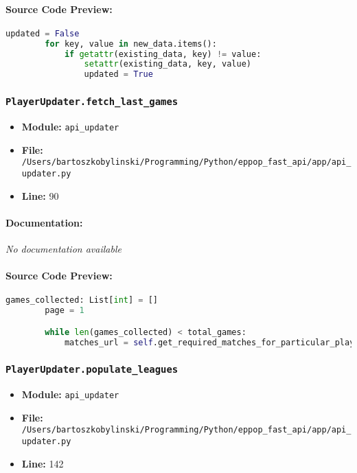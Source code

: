 \documentclass[11pt,a4paper]{article}
\begin{document}
\paragraph{Source Code Preview:}
\begin{lstlisting}[language=Python]
        updated = False
        for key, value in new_data.items():
            if getattr(existing_data, key) != value:
                setattr(existing_data, key, value)
                updated = True
\end{lstlisting}

\vspace{1em}
\subsubsection{\texttt{PlayerUpdater.fetch\_last\_games}}

\begin{itemize}
    \item \textbf{Module:} \texttt{api\_updater}
    \item \textbf{File:} \texttt{/Users/bartoszkobylinski/Programming/Python/eppop\_fast\_api/app/api\_updater.py}
    \item \textbf{Line:} 90
\end{itemize}

\paragraph{Documentation:} \textit{No documentation available}

\paragraph{Source Code Preview:}
\begin{lstlisting}[language=Python]
        games_collected: List[int] = []
        page = 1

        while len(games_collected) < total_games:
            matches_url = self.get_required_matches_for_particular_player(player_id,
\end{lstlisting}

\vspace{1em}
\subsubsection{\texttt{PlayerUpdater.populate\_leagues}}

\begin{itemize}
    \item \textbf{Module:} \texttt{api\_updater}
    \item \textbf{File:} \texttt{/Users/bartoszkobylinski/Programming/Python/eppop\_fast\_api/app/api\_updater.py}
    \item \textbf{Line:} 142
\end{itemize}
\end{document}
